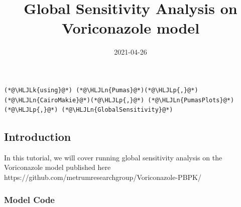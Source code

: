 \documentclass[12pt,a4paper]{article}
\title{ Global Sensitivity Analysis on Voriconazole model }
\date{ 2021-04-26 }
\newcommand{\HLJLk}[1]{\textcolor[RGB]{148,91,176}{\textbf{#1}}}
\newcommand{\HLJLn}[1]{#1}
\newcommand{\HLJLp}[1]{#1}
\begin{document}
\maketitle


\begin{lstlisting}
(*@\HLJLk{using}@*) (*@\HLJLn{Pumas}@*)(*@\HLJLp{,}@*) (*@\HLJLn{CairoMakie}@*)(*@\HLJLp{,}@*) (*@\HLJLn{PumasPlots}@*)(*@\HLJLp{,}@*) (*@\HLJLn{GlobalSensitivity}@*)
\end{lstlisting}


\subsection{Introduction}
In this tutorial, we will cover running global sensitivity analysis on the Voriconazole model published here https://github.com/metrumresearchgroup/Voriconazole-PBPK/

\subsubsection{Model Code}
\end{document}
